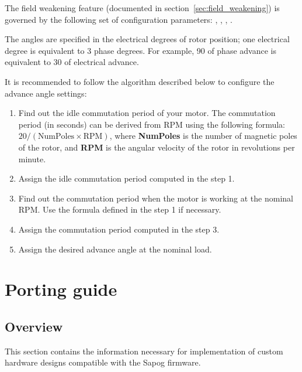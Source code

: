 \documentclass{zubaxdoc}
\begin{document}
	The field weakening feature (documented in section~\ref{sec:field_weakening}) is governed by the following
	set of configuration parameters:
	, , , .
	
	The angles are specified in the electrical degrees of rotor position;
	one electrical degree is equivalent to 3 phase degrees.
	For example, 90\textdegree{} of phase advance is equivalent to 30\textdegree{} of electrical advance.
	
	It is recommended to follow the algorithm described below to configure the advance angle settings:
	
	\begin{enumerate}
		\item Find out the idle commutation period of your motor.
		The commutation period (in seconds) can be derived from RPM using the following formula:
		$20 / (\text{NumPoles}\times\text{RPM})$, where \textbf{NumPoles} is the number of magnetic poles
		of the rotor, and \textbf{RPM} is the angular velocity of the rotor in revolutions per minute.
		
		\item Assign  the idle commutation period computed in the step 1.
		
		\item Find out the commutation period when the motor is working at the nominal RPM.
		Use the formula defined in the step 1 if necessary.
		
		\item Assign  the commutation period computed in the step 3.
		
		\item Assign  the desired advance angle at the nominal load.
	\end{enumerate}
	
	\chapter{Porting guide}\label{sec:porting_guide}
	
	\section{Overview}
	
	This section contains the information necessary for implementation of custom hardware designs compatible with the
	Sapog firmware.
	
\end{document}
